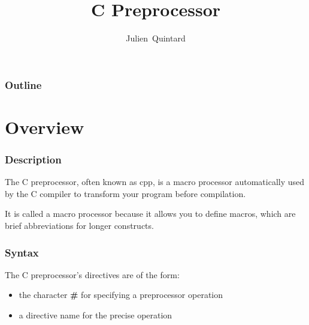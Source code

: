 
%
%



%
%

\title{C Preprocessor}

%
%

\author
{
  Julien~Quintard
}

%
%



%
%

\begin{frame}
  \titlepage

  \begin{center}
    \logos
  \end{center}
\end{frame}

%
%

\begin{frame}
  \frametitle{Outline}
  \tableofcontents
\end{frame}

%
%

\section{Overview}


\begin{frame}
  \frametitle{Description}

  The C preprocessor, often known as cpp, is a macro processor
  automatically used by the C compiler to transform your program
  before compilation.

  \nl

  It is called a macro processor because it allows you to define macros,
  which are brief abbreviations for longer constructs.
\end{frame}


\begin{frame}
  \frametitle{Syntax}

  The C preprocessor's directives are of the form:

  \begin{itemize}[<+->]
    \item
      the character \textbf{\#} for specifying a preprocessor operation
    \item
      a directive name for the precise operation
  \end{itemize}
\end{frame}

